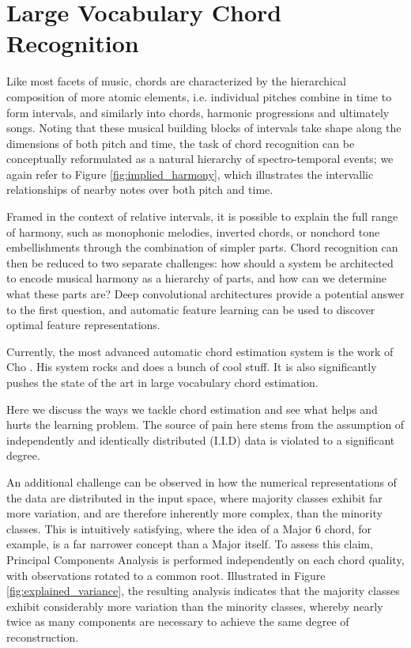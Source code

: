 \section{Large Vocabulary Chord Recognition}

Like most facets of music, chords are characterized by the hierarchical composition of more atomic elements, i.e. individual pitches combine in time to form intervals, and similarly into chords, harmonic progressions and ultimately songs.
Noting that these musical building blocks of intervals take shape along the dimensions of both pitch and time, the task of chord recognition can be conceptually reformulated as a natural hierarchy of spectro-temporal events; we again refer to Figure \ref{fig:implied_harmony}, which illustrates the intervallic relationships of nearby notes over both pitch and time.

Framed in the context of relative intervals, it is possible to explain the full range of harmony, such as monophonic melodies, inverted chords, or nonchord tone embellishments through the combination of simpler parts.
Chord recognition can then be reduced to two separate challenges: how should a system be architected to encode musical harmony as a hierarchy of parts, and how can we determine what these parts are?
Deep convolutional architectures provide a potential answer to the first question, and automatic feature learning can be used to discover optimal feature representations.

Currently, the most advanced automatic chord estimation system is the work of Cho \cite{Cho2014}.
His system rocks and does a bunch of cool stuff.
It is also significantly pushes the state of the art in large vocabulary chord estimation.


Here we discuss the ways we tackle chord estimation and see what helps and hurts the learning problem.
The source of pain here stems from the assumption of independently and identically distributed (I.I.D) data is violated to a significant degree.


An additional challenge can be observed in how the numerical representations of the data are distributed in the input space, where majority classes exhibit far more variation, and are therefore inherently more complex, than the minority classes.
This is intuitively satisfying, where the idea of a Major 6 chord, for example, is a far narrower concept than a Major itself.
To assess this claim, Principal Components Analysis is performed independently on each chord quality, with observations rotated to a common root.
Illustrated in Figure \ref{fig:explained_variance}, the resulting analysis indicates that the majority classes exhibit considerably more variation than the minority classes, whereby nearly twice as many components are necessary to achieve the same degree of reconstruction.


